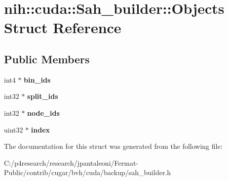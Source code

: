 \hypertarget{structnih_1_1cuda_1_1_sah__builder_1_1_objects}{}\section{nih\+:\+:cuda\+:\+:Sah\+\_\+builder\+:\+:Objects Struct Reference}
\label{structnih_1_1cuda_1_1_sah__builder_1_1_objects}
\subsection*{Public Members}
\begin{DoxyCompactItemize}
\item 
\mbox{\label{structnih_1_1cuda_1_1_sah__builder_1_1_objects_ad038bc26a4e4ca433e2c255c05de038c}} 
int4 $\ast$ {\bfseries bin\+\_\+ids}
\item 
\mbox{\label{structnih_1_1cuda_1_1_sah__builder_1_1_objects_a50ae2705e3a3d61fd738f04862a18620}} 
int32 $\ast$ {\bfseries split\+\_\+ids}
\item 
\mbox{\label{structnih_1_1cuda_1_1_sah__builder_1_1_objects_ac7057ed134798b2d824b16a414fbbad0}} 
int32 $\ast$ {\bfseries node\+\_\+ids}
\item 
\mbox{\label{structnih_1_1cuda_1_1_sah__builder_1_1_objects_aac134a77600ec2b67629622dbe334ae1}} 
uint32 $\ast$ {\bfseries index}
\end{DoxyCompactItemize}


The documentation for this struct was generated from the following file\+:\begin{DoxyCompactItemize}
\item 
C\+:/p4research/research/jpantaleoni/\+Fermat-\/\+Public/contrib/cugar/bvh/cuda/backup/sah\+\_\+builder.\+h\end{DoxyCompactItemize}

